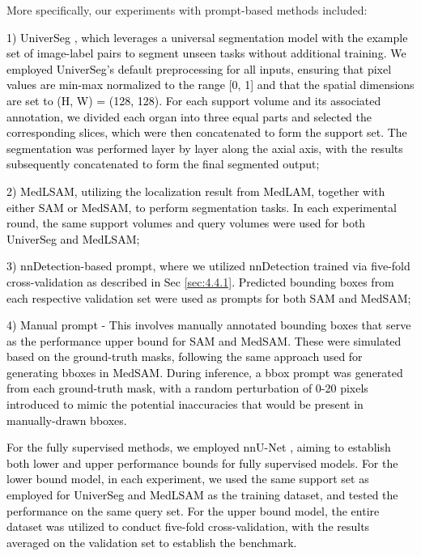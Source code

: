 \documentclass[times,twocolumn,final]{elsarticle}
\begin{document}
\par More specifically, our experiments with prompt-based methods included:
 \par \noindent\textcolor{black}{1) UniverSeg \cite{butoi2023universeg}, which leverages a universal segmentation model with the example set of image-label pairs to segment unseen tasks without additional training. We employed UniverSeg's default preprocessing for all inputs, ensuring that pixel values are min-max normalized to the range [0, 1] and that the spatial dimensions are set to (H, W) = (128, 128). For each support volume and its associated annotation, we divided each organ into three equal parts and selected the corresponding slices, which were then concatenated to form the support set. The segmentation was performed layer by layer along the axial axis, with the results subsequently concatenated to form the final segmented output;} 
 \par \noindent\textcolor{black}{2) MedLSAM, utilizing the localization result from MedLAM, together with either SAM or MedSAM, to perform segmentation tasks. In each experimental round, the same support volumes and query volumes were used for both UniverSeg and MedLSAM;} 
 \par \noindent\textcolor{black}{3) nnDetection-based prompt, where we utilized nnDetection trained via five-fold cross-validation as described in Sec \ref{sec:4.4.1}. Predicted bounding boxes from each respective validation set were used as prompts for both SAM and MedSAM;} 
 \par \noindent\textcolor{black}{4) Manual prompt - This involves manually annotated bounding boxes that serve as the performance upper bound for SAM and MedSAM. These were simulated based on the ground-truth masks, following the same approach used for generating bboxes in MedSAM. During inference, a bbox prompt was generated from each ground-truth mask, with a random perturbation of 0-20 pixels introduced to mimic the potential inaccuracies that would be present in manually-drawn bboxes.}
\par \textcolor{black}{For the fully supervised methods, we employed nnU-Net \cite{isensee2021nnu}, aiming to establish both lower and upper performance bounds for fully supervised models. For the lower bound model, in each experiment, we used the same support set as employed for UniverSeg and MedLSAM as the training dataset, and tested the performance on the same query set. For the upper bound model, the entire dataset was utilized to conduct five-fold cross-validation, with the results averaged on the validation set to establish the benchmark.
}
\end{document}
